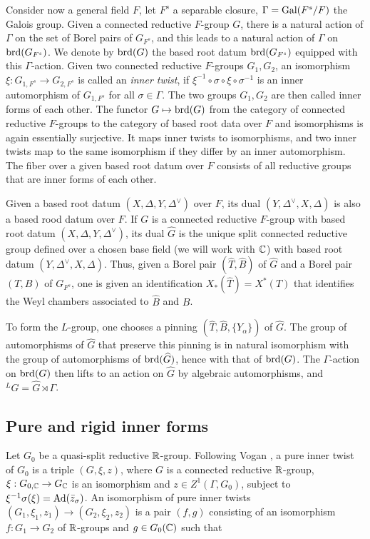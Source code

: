 \documentclass{article}
\theoremstyle{definition}
\numberwithin{equation}{section}
\renewcommand{\-}{\hyp{}}
\begin{document}
Consider now a general field $F$, let $F^s$ a separable closure, $\Gamma=\textrm{Gal}(F^s/F)$ the Galois group. Given a connected reductive $F$-group $G$, there is a natural action of $\Gamma$ on the set of Borel pairs of $G_{F^s}$, and this leads to a natural action of $\Gamma$ on $\textrm{brd}(G_{F^s})$. We denote by $\textrm{brd}(G)$ the based root datum $\textrm{brd}(G_{F^s})$ equipped with this $\Gamma$-action. Given two connected reductive $F$-groups $G_1,G_2$, an isomorphism $\xi : G_{1,F^s} \to G_{2,F^s}$ is called an \emph{inner twist}, if $\xi^{-1}\circ\sigma\circ\xi\circ\sigma^{-1}$ is an inner automorphism of $G_{1,F^s}$ for all $\sigma \in \Gamma$. The two groups $G_1,G_2$ are then called inner forms of each other. The functor $G \mapsto \textrm{brd}(G)$ from the category of connected reductive $F$-groups to the category of based root data over $F$ and isomorphisms is again essentially surjective. It maps inner twists to isomorphisms, and two inner twists map to the same isomorphism if they differ by an inner automorphism. The fiber over a given based root datum over $F$ consists of all reductive groups that are inner forms of each other.

Given a based root datum $(X,\Delta,Y,\Delta^\vee)$ over $F$, its dual $(Y,\Delta^\vee,X,\Delta)$ is also a based rood datum over $F$. If $G$ is a connected reductive $F$-group with based root datum $(X,\Delta,Y,\Delta^\vee)$, its dual $\hat G$ is the unique split connected reductive group defined over a chosen base field (we will work with $\mathbb{C}$) with based root datum $(Y,\Delta^\vee,X,\Delta)$. Thus, given a Borel pair $(\hat T,\hat B)$ of $\hat G$ and a Borel pair $(T,B)$ of $G_{F^s}$, one is given an identification $X_*(\hat T)=X^*(T)$ that identifies the Weyl chambers associated to $\hat B$ and $B$.

To form the $L$-group, one chooses a pinning $(\hat T,\hat B,\{Y_\alpha\})$ of $\hat G$. The group of automorphisms of $\hat G$ that preserve this pinning is in natural isomorphism with the group of automorphisms of $\textrm{brd}(\widehat G)$, hence with that of $\textrm{brd}(G)$. The $\Gamma$-action on $\textrm{brd}(G)$ then lifts to an action on $\hat G$ by algebraic automorphisms, and $^LG=\hat G \rtimes \Gamma$.


\subsection{Pure and rigid inner forms}

Let $G_0$ be a quasi-split reductive $\mathbb{R}$-group. Following Vogan \cite{Vog93}, a pure inner twist of $G_0$ is a triple $(G,\xi,z)$, where $G$ is a connected reductive $\mathbb{R}$-group, $\xi : G_{0,\mathbb{C}} \to G_{\mathbb{C}}$ is an isomorphism and $z \in Z^1(\Gamma,G_0)$, subject to $\xi^{-1}\sigma(\xi)=\textrm{Ad}(\bar z_\sigma)$. An isomorphism of pure inner twists $(G_1,\xi_1,z_1) \to (G_2,\xi_2,z_2)$ is a pair $(f,g)$ consisting of an isomorphism $f : G_1 \to G_2$ of $\mathbb{R}$-groups and $g \in G_0(\mathbb{C})$ such that
\end{document}
